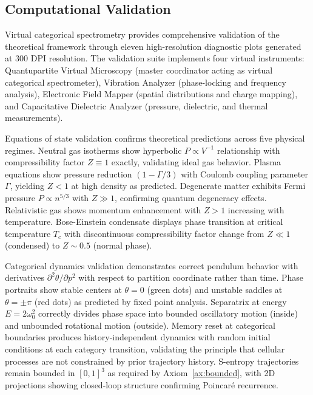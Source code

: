 \documentclass[12pt,a4paper]{article}
\theoremstyle{plain}
\theoremstyle{definition}
\theoremstyle{remark}
\begin{document}
\subsection{Computational Validation}

Virtual categorical spectrometry provides comprehensive validation of the theoretical framework through eleven high-resolution diagnostic plots generated at 300 DPI resolution. The validation suite implements four virtual instruments: Quantupartite Virtual Microscopy (master coordinator acting as virtual categorical spectrometer), Vibration Analyzer (phase-locking and frequency analysis), Electronic Field Mapper (spatial distributions and charge mapping), and Capacitative Dielectric Analyzer (pressure, dielectric, and thermal measurements).

Equations of state validation confirms theoretical predictions across five physical regimes. Neutral gas isotherms show hyperbolic $P \propto V^{-1}$ relationship with compressibility factor $Z \equiv 1$ exactly, validating ideal gas behavior. Plasma equations show pressure reduction $(1 - \Gamma/3)$ with Coulomb coupling parameter $\Gamma$, yielding $Z < 1$ at high density as predicted. Degenerate matter exhibits Fermi pressure $P \propto n^{5/3}$ with $Z \gg 1$, confirming quantum degeneracy effects. Relativistic gas shows momentum enhancement with $Z > 1$ increasing with temperature. Bose-Einstein condensate displays phase transition at critical temperature $T_c$ with discontinuous compressibility factor change from $Z \ll 1$ (condensed) to $Z \sim 0.5$ (normal phase).

Categorical dynamics validation demonstrates correct pendulum behavior with derivatives $\partial^2\theta/\partial p^2$ with respect to partition coordinate rather than time. Phase portraits show stable centers at $\theta = 0$ (green dots) and unstable saddles at $\theta = \pm\pi$ (red dots) as predicted by fixed point analysis. Separatrix at energy $E = 2\omega_0^2$ correctly divides phase space into bounded oscillatory motion (inside) and unbounded rotational motion (outside). Memory reset at categorical boundaries produces history-independent dynamics with random initial conditions at each category transition, validating the principle that cellular processes are not constrained by prior trajectory history. S-entropy trajectories remain bounded in $[0,1]^3$ as required by Axiom~\ref{ax:bounded}, with 2D projections showing closed-loop structure confirming Poincaré recurrence.
\end{document}

